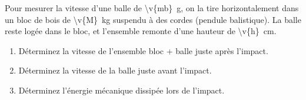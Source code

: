 Pour mesurer la vitesse d'une balle de \qty{\v{mb}}{g}, on la tire horizontalement dans un bloc de bois de \qty{\v{M}}{kg} suspendu à des cordes (pendule balistique). La balle reste logée dans le bloc, et l'ensemble remonte d'une hauteur de \qty{\v{h}}{cm}.

\begin{enumerate}[label=\alph*)]
    \item Déterminez la vitesse de l'ensemble bloc + balle juste après l'impact.
    \item Déterminez la vitesse de la balle juste avant l'impact.
    \item Déterminez l'énergie mécanique dissipée lors de l'impact.
\end{enumerate}
